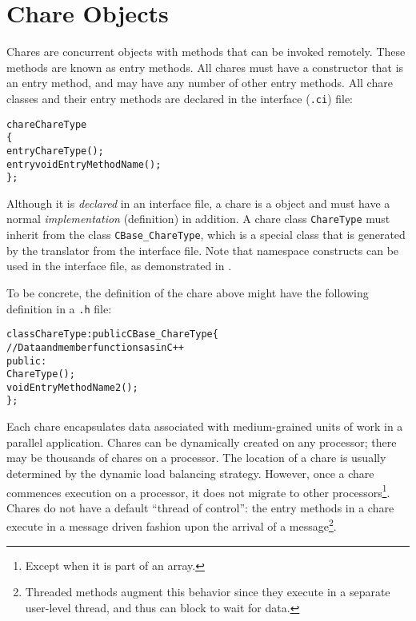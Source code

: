 \section{Chare Objects}

Chares are concurrent objects with methods that can be invoked
remotely. These methods are known as entry methods. All
chares must have a constructor that is an entry method, and may have any
number of other entry methods. All chare classes and their entry methods are
declared in the interface (\texttt{.ci}) file:

\begin{alltt}
    chare ChareType
    \{
        entry ChareType();
        entry void EntryMethodName();
    \};
\end{alltt}

Although it is {\em declared} in an interface file, a chare is a \CC{} object
and must have a normal \CC{} {\em implementation} (definition) in addition. A
chare class {\tt ChareType} must inherit from the class {\tt CBase\_ChareType},
which is a special class that is generated by the \charmpp translator from the
interface file. Note that \CC{} namespace constructs can be used in the
interface file, as demonstrated in .

To be concrete, the \CC{} definition of the chare above might have 
the following definition in a \texttt{.h} file:

\begin{alltt}
   class ChareType : public CBase\_ChareType \{
       // Data and member functions as in C++
       public:
           ChareType();
           void EntryMethodName2();
   \};
\end{alltt}

Each chare encapsulates data associated with medium-grained units of work in a
parallel application.
Chares can be dynamically created on any processor; there may
be thousands of chares on a processor. The location of a chare is
usually determined by the dynamic load balancing strategy. However,
once a chare commences execution on a processor, it does not migrate
to other processors\footnote{Except when it is part of an array.}.  
Chares do not have a default ``thread of
control'': the entry methods  in a
chare execute in a message driven fashion upon the arrival of a 
message\footnote{Threaded methods augment this behavior since they execute in
a separate user-level thread, and thus can block to wait for data.}.

